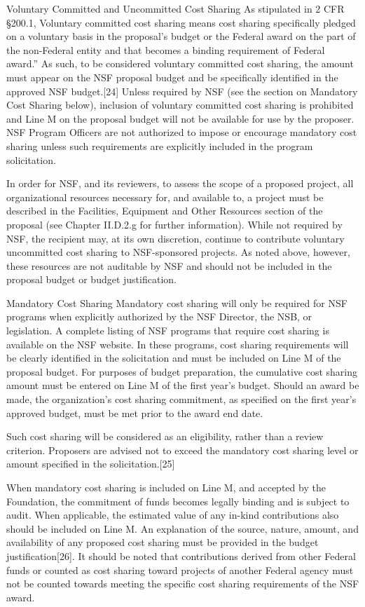 {Voluntary Committed and Uncommitted Cost Sharing
As stipulated in 2 CFR §200.1, Voluntary committed cost sharing means cost sharing specifically pledged on a voluntary basis in the proposal's budget or the Federal award on the part of the non-Federal entity and that becomes a binding requirement of Federal award.” As such, to be considered voluntary committed cost sharing, the amount must appear on the NSF proposal budget and be specifically identified in the approved NSF budget.[24] Unless required by NSF (see the section on Mandatory Cost Sharing below), inclusion of voluntary committed cost sharing is prohibited and Line M on the proposal budget will not be available for use by the proposer. NSF Program Officers are not authorized to impose or encourage mandatory cost sharing unless such requirements are explicitly included in the program solicitation.

In order for NSF, and its reviewers, to assess the scope of a proposed project, all organizational resources necessary for, and available to, a project must be described in the Facilities, Equipment and Other Resources section of the proposal (see Chapter II.D.2.g for further information). While not required by NSF, the recipient may, at its own discretion, continue to contribute voluntary uncommitted cost sharing to NSF-sponsored projects. As noted above, however, these resources are not auditable by NSF and should not be included in the proposal budget or budget justification.

Mandatory Cost Sharing
Mandatory cost sharing will only be required for NSF programs when explicitly authorized by the NSF Director, the NSB, or legislation. A complete listing of NSF programs that require cost sharing is available on the NSF website. In these programs, cost sharing requirements will be clearly identified in the solicitation and must be included on Line M of the proposal budget. For purposes of budget preparation, the cumulative cost sharing amount must be entered on Line M of the first year’s budget. Should an award be made, the organization’s cost sharing commitment, as specified on the first year’s approved budget, must be met prior to the award end date.

Such cost sharing will be considered as an eligibility, rather than a review criterion. Proposers are advised not to exceed the mandatory cost sharing level or amount specified in the solicitation.[25]

When mandatory cost sharing is included on Line M, and accepted by the Foundation, the commitment of funds becomes legally binding and is subject to audit. When applicable, the estimated value of any in-kind contributions also should be included on Line M. An explanation of the source, nature, amount, and availability of any proposed cost sharing must be provided in the budget justification[26]. It should be noted that contributions derived from other Federal funds or counted as cost sharing toward projects of another Federal agency must not be counted towards meeting the specific cost sharing requirements of the NSF award.

}
